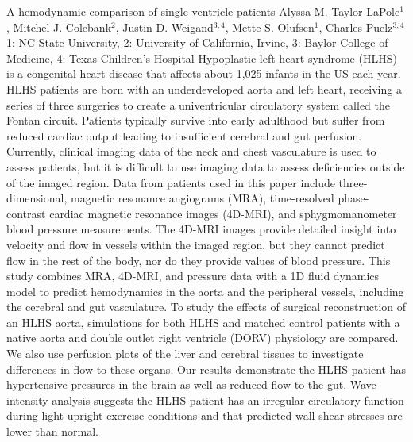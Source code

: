 \vspace{1.5ex}
\abs
{A hemodynamic comparison of single ventricle patients}
{Alyssa M. Taylor-LaPole$^{1}$, Mitchel J. Colebank$^{2}$, Justin D. Weigand$^{3,4}$, Mette S. Olufsen$^{1}$, Charles Puelz$^{3,4}$}
{1: NC State University, 2: University of California, Irvine, 3: Baylor College of Medicine, 4: Texas Children’s Hospital }
{Hypoplastic left heart syndrome (HLHS) is a congenital heart disease that affects about 1,025 infants in the US each year. HLHS patients are born with an underdeveloped aorta and left heart, receiving a series of three surgeries to create a univentricular circulatory system called the Fontan circuit. Patients typically survive into early adulthood but suffer from reduced cardiac output leading to insufficient cerebral and gut perfusion. Currently, clinical imaging data of the neck and chest vasculature is used to assess patients, but it is difficult to use imaging data to assess deficiencies outside of the imaged region. Data from patients used in this paper include three-dimensional, magnetic resonance angiograms (MRA), time-resolved phase-contrast cardiac magnetic resonance images (4D-MRI), and sphygmomanometer blood pressure measurements. The 4D-MRI images provide detailed insight into velocity and flow in vessels within the imaged region, but they cannot predict flow in the rest of the body, nor do they provide values of blood pressure. This study combines MRA, 4D-MRI, and pressure data with a 1D fluid dynamics model to predict hemodynamics in the aorta and the peripheral vessels, including the cerebral and gut vasculature. To study the effects of surgical reconstruction of an HLHS aorta, simulations for both HLHS and matched control patients with a native aorta and double outlet right ventricle (DORV) physiology are compared. We also use perfusion plots of the liver and cerebral tissues to investigate differences in flow to these organs. Our results demonstrate the HLHS patient has hypertensive pressures in the brain as well as reduced flow to the gut. Wave-intensity analysis suggests the HLHS patient has an irregular circulatory function during light upright exercise conditions and that predicted wall-shear stresses are lower than normal.}


